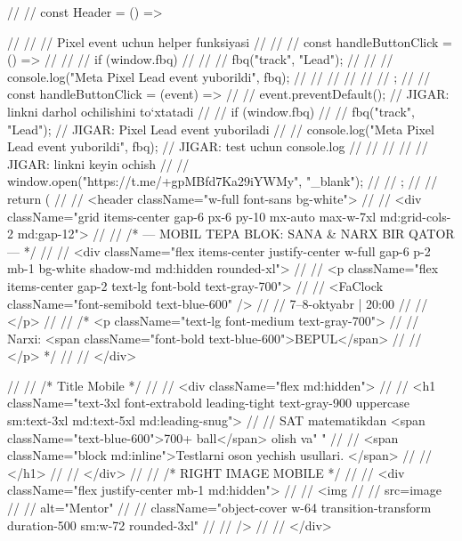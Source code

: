 // // const Header = () => {
// //     // Pixel event uchun helper funksiyasi
// //     // const handleButtonClick = () => {
// //     //     if (window.fbq) {
// //     //         fbq("track", "Lead");
// //     //         console.log("Meta Pixel Lead event yuborildi", fbq);
// //     //     }
// //     // };
// //     const handleButtonClick = (event) => {
// //         event.preventDefault(); // JIGAR: linkni darhol ochilishini to‘xtatadi
// //         if (window.fbq) {
// //             fbq("track", "Lead"); // JIGAR: Pixel Lead event yuboriladi
// //             console.log("Meta Pixel Lead event yuborildi", fbq); // JIGAR: test uchun console.log
// //         }
// //         // JIGAR: linkni keyin ochish
// //         window.open("https://t.me/+gpMBfd7Ka29iYWMy", "_blank");
// //     };
// //     return (
// //         <header className="w-full font-sans bg-white">
// //             <div className="grid items-center gap-6 px-6 py-10 mx-auto max-w-7xl md:grid-cols-2 md:gap-12">
// //                 {/* --- MOBIL TEPA BLOK: SANA & NARX BIR QATOR --- */}
// //                 <div className="flex items-center justify-center w-full gap-6 p-2 mb-1 bg-white shadow-md md:hidden rounded-xl">
// //                     <p className="flex items-center gap-2 text-lg font-bold text-gray-700">
// //                         <FaClock className="font-semibold text-blue-600" />
// //                         7–8-oktyabr | 20:00
// //                     </p>
// //                     {/* <p className="text-lg font-medium text-gray-700">
// //                         Narxi: <span className="font-bold text-blue-600">BEPUL</span>
// //                     </p> */}
// //                 </div>

// //                 {/* Title Mobile */}
// //                 <div className="flex md:hidden">
// //                     <h1 className="text-3xl font-extrabold leading-tight text-gray-900 uppercase sm:text-3xl md:text-5xl md:leading-snug">
// //                         SAT matematikdan <span className="text-blue-600">700+ ball</span> olish va{" "}
// //                         <span className="block md:inline">Testlarni oson yechish usullari. </span>
// //                     </h1>
// //                 </div>
// //                 {/* RIGHT IMAGE MOBILE */}
// //                 <div className="flex justify-center mb-1 md:hidden">
// //                     <img
// //                         src={image}
// //                         alt="Mentor"
// //                         className="object-cover w-64 transition-transform duration-500 sm:w-72 rounded-3xl"
// //                     />
// //                 </div>

}

